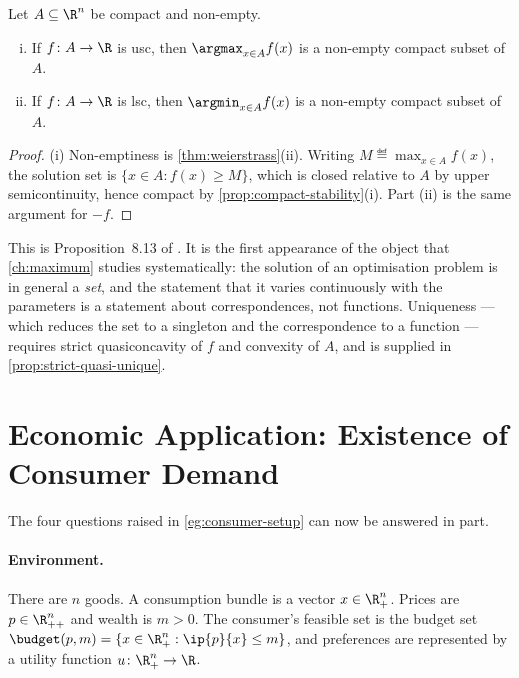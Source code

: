 \begin{proposition}\label{prop:argmax-compact}
	Let $A\subseteq\R^n$ be compact and non-empty.
	\begin{enumerate}[(i)]
		\item If $f\colon A\to\R$ is usc, then
		      $\argmax_{x\in A}f(x)$ is a non-empty compact subset of $A$.
		\item If $f\colon A\to\R$ is lsc, then $\argmin_{x\in A}f(x)$ is a non-empty
		      compact subset of $A$.
	\end{enumerate}
\end{proposition}

\begin{proof}
	(i) Non-emptiness is \autoref{thm:weierstrass}(ii). Writing
	$M\eqdef\max_{x\in A}f(x)$, the solution set is
	$\{x\in A : f(x)\geq M\}$, which is closed relative to $A$ by upper
	semicontinuity, hence compact by \autoref{prop:compact-stability}(i). Part (ii)
	is the same argument for $-f$.
\end{proof}

This is Proposition~8.13 of \textcite[p.~275]{fukuda2026notes}. It is the first
appearance of the object that \autoref{ch:maximum} studies systematically: the
solution of an optimisation problem is in general a \emph{set}, and the
statement that it varies continuously with the parameters is a statement about
correspondences, not functions. Uniqueness --- which reduces the set to a
singleton and the correspondence to a function --- requires strict quasiconcavity
of $f$ and convexity of $A$, and is supplied in \autoref{prop:strict-quasi-unique}.

\section{Economic Application: Existence of Consumer Demand}\label{sec:cont-demand}

The four questions raised in \autoref{eg:consumer-setup} can now be answered in
part.

\paragraph{Environment.} There are $n$ goods. A consumption bundle is a vector
$x\in\R^n_+$. Prices are $p\in\R^n_{++}$ and wealth is $m>0$. The consumer's
feasible set is the budget set
$\budget(p,m)=\{x\in\R^n_+ : \ip{p}{x}\leq m\}$, and preferences are
represented by a utility function $u\colon\R^n_+\to\R$.

